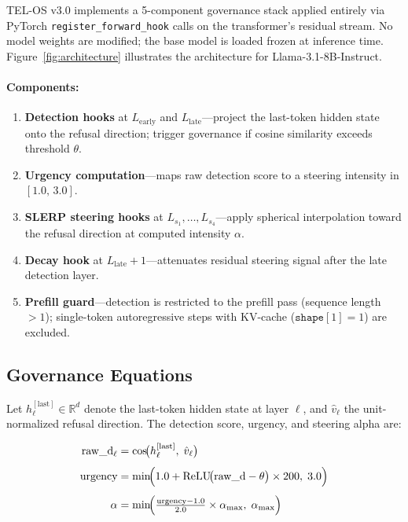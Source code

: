 \documentclass{article}
\begin{document}
TEL-OS v3.0 implements a 5-component governance stack applied entirely via PyTorch
\texttt{register\_forward\_hook} calls on the transformer's residual stream.
No model weights are modified; the base model is loaded frozen at inference time.
Figure~\ref{fig:architecture} illustrates the architecture for Llama-3.1-8B-Instruct.

\paragraph{Components:}
\begin{enumerate}
    \item \textbf{Detection hooks} at $L_\text{early}$ and $L_\text{late}$---project
    the last-token hidden state onto the refusal direction; trigger governance if
    cosine similarity exceeds threshold $\theta$.

    \item \textbf{Urgency computation}---maps raw detection score to a steering
    intensity in $[1.0,\, 3.0]$.

    \item \textbf{SLERP steering hooks} at $L_{s_1}, \ldots, L_{s_4}$---apply
    spherical interpolation toward the refusal direction at computed intensity $\alpha$.

    \item \textbf{Decay hook} at $L_\text{late}+1$---attenuates residual steering
    signal after the late detection layer.

    \item \textbf{Prefill guard}---detection is restricted to the prefill pass
    (sequence length $> 1$); single-token autoregressive steps with KV-cache
    ($\texttt{shape}[1] = 1$) are excluded.
\end{enumerate}

\subsection{Governance Equations}
\label{subsec:equations}

Let $h_\ell^{[\text{last}]} \in \mathbb{R}^d$ denote the last-token hidden state
at layer $\ell$, and $\hat{v}_\ell$ the unit-normalized refusal direction.
The detection score, urgency, and steering alpha are:

\begin{align}
\text{raw\_d}_\ell &= \cos\!\bigl(h_\ell^{[\text{last}]},\; \hat{v}_\ell\bigr)
\label{eq:detection} \\[4pt]
\text{urgency} &= \min\!\Bigl(1.0 + \text{ReLU}\!\bigl(\text{raw\_d} - \theta\bigr)
\times 200,\; 3.0\Bigr)
\label{eq:urgency} \\[4pt]
\alpha &= \min\!\Bigl(\tfrac{\text{urgency} - 1.0}{2.0} \times \alpha_{\max},\;
\alpha_{\max}\Bigr)
\label{eq:alpha}
\end{align}
\end{document}
